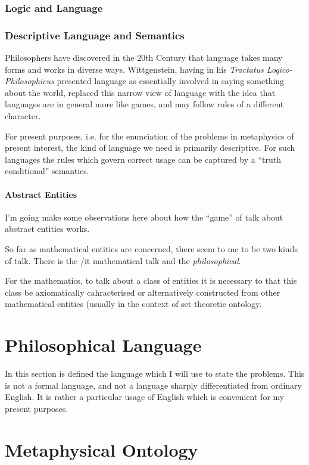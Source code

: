 \documentclass{rbjk}
\begin{document}
\begin{article}
\section{Logic and Language}
\section{Descriptive Language and Semantics}

Philosophers have discovered in the 20th Century that language takes many forms and works in diverse ways.
Wittgenstein, having in his {\it Tractatus Logico-Philosophicus} presented language as essentially involved in saying something about the world, replaced this narrow view of language with the idea that languages are in general more like games, and may follow rules of a different character.

For present purposes, i.e. for the enunciation of the problems in metaphysics of present interest, the kind of language we need is primarily descriptive.
For such languages the rules which govern correct usage can be captured by a ``truth conditional'' semantics.

\subsection{Abstract Entities}

I'm going make some observations here about how the ``game'' of talk about abstract entities works. 

So far as mathematical entities are concerned, there seem to me to be two kinds of talk.
There is the {/it mathematical} talk and the {\it philosophical}.

For the mathematics, to talk about a class of entities it is necessary to that this class be axiomatically cahracterised or alternatively constructed from other mathematical entities (usually in the context of set theoretic ontology.

\part{Philosophical Language}

In this section is defined the language which I will use to state the problems.
This is not a formal language, and not a language sharply differentiated from ordinary English.
It is rather a particular usage of English which is convenient for my present purposes.

\part{Metaphysical Ontology}


\end{article}
\end{document}

